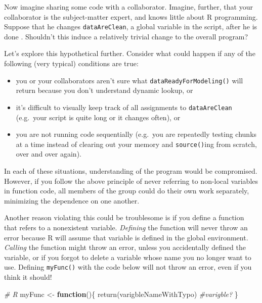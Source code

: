 \documentclass[
  12pt,
  krantz2]{krantz}
\makeatletter
\newenvironment{Shaded}{\begin{snugshade}}{\end{snugshade}}
\newcommand{\CommentTok}[1]{\textcolor[rgb]{0.37,0.37,0.37}{\textit{#1}}}
\newcommand{\ControlFlowTok}[1]{\textcolor[rgb]{0.27,0.27,0.27}{\textbf{#1}}}
\newcommand{\FunctionTok}[1]{\textcolor[rgb]{0,0,0}{#1}}
\newcommand{\NormalTok}[1]{#1}
\newcommand{\OtherTok}[1]{\textcolor[rgb]{0.37,0.37,0.37}{#1}}
\providecommand{\tightlist}{%
  \setlength{\itemsep}{0pt}\setlength{\parskip}{0pt}}
\newenvironment{kframe}{%
\medskip{}
\setlength{\fboxsep}{.8em}
 \def\at@end@of@kframe{}%
 \ifinner\ifhmode%
  \def\at@end@of@kframe{\end{minipage}}%
  \begin{minipage}{\columnwidth}%
 \fi\fi%
 \def\FrameCommand##1{\hskip\@totalleftmargin \hskip-\fboxsep
 \colorbox{shadecolor}{##1}\hskip-\fboxsep
     \hskip-\linewidth \hskip-\@totalleftmargin \hskip\columnwidth}%
 \MakeFramed {\advance\hsize-\width
   \@totalleftmargin\z@ \linewidth\hsize
   \@setminipage}}%
 {\par\unskip\endMakeFramed%
 \at@end@of@kframe}
\renewenvironment{Shaded}{\begin{kframe}}{\end{kframe}}
\makeatother
\begin{document}
Now imagine sharing some code with a collaborator. Imagine, further, that your collaborator is the subject-matter expert, and knows little about R programming. Suppose that he changes \texttt{dataAreClean}, a global variable in the script, after he is done . Shouldn't this induce a relatively trivial change to the overall program?

Let's explore this hypothetical further. Consider what could happen if any of the following (very typical) conditions are true:

\begin{itemize}
\tightlist
\item
  you or your collaborators aren't sure what \texttt{dataReadyForModeling()} will return because you don't understand dynamic lookup, or
\item
  it's difficult to visually keep track of all assignments to \texttt{dataAreClean} (e.g.~your script is quite long or it changes often), or
\item
  you are not running code sequentially (e.g.~you are repeatedly testing chunks at a time instead of clearing out your memory and \texttt{source()}ing from scratch, over and over again).
\end{itemize}

In each of these situations, understanding of the program would be compromised. However, if you follow the above principle of never referring to non-local variables in function code, all members of the group could do their own work separately, minimizing the dependence on one another.

Another reason violating this could be troublesome is if you define a function that refers to a nonexistent variable. \emph{Defining} the function will never throw an error because R will assume that variable is defined in the global environment. \emph{Calling} the function might throw an error, unless you accidentally defined the variable, or if you forgot to delete a variable whose name you no longer want to use. Defining \texttt{myFunc()} with the code below will not throw an error, even if you think it should!

\begin{Shaded}
\begin{Highlighting}[]
\CommentTok{\# R}
\NormalTok{myFunc }\OtherTok{\textless{}{-}} \ControlFlowTok{function}\NormalTok{()\{}
  \FunctionTok{return}\NormalTok{(varigbleNameWithTypo) }\CommentTok{\#varigble?}
\NormalTok{\}}
\end{Highlighting}
\end{Shaded}
\end{document}
